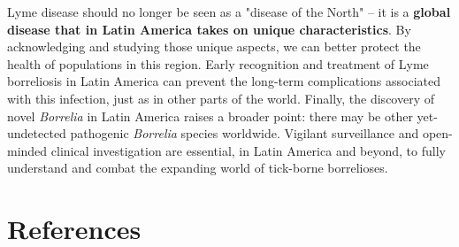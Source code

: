 \documentclass[11pt,letterpaper]{article}
\begin{document}
Lyme disease should no longer be seen as a "disease of the North" – it is a \textbf{global disease that in Latin America takes on unique characteristics}. By acknowledging and studying those unique aspects, we can better protect the health of populations in this region. Early recognition and treatment of Lyme borreliosis in Latin America can prevent the long-term complications associated with this infection, just as in other parts of the world. Finally, the discovery of novel \textit{Borrelia} in Latin America raises a broader point: there may be other yet-undetected pathogenic \textit{Borrelia} species worldwide. Vigilant surveillance and open-minded clinical investigation are essential, in Latin America and beyond, to fully understand and combat the expanding world of tick-borne borrelioses.

\clearpage
\section*{References}
\end{document}
